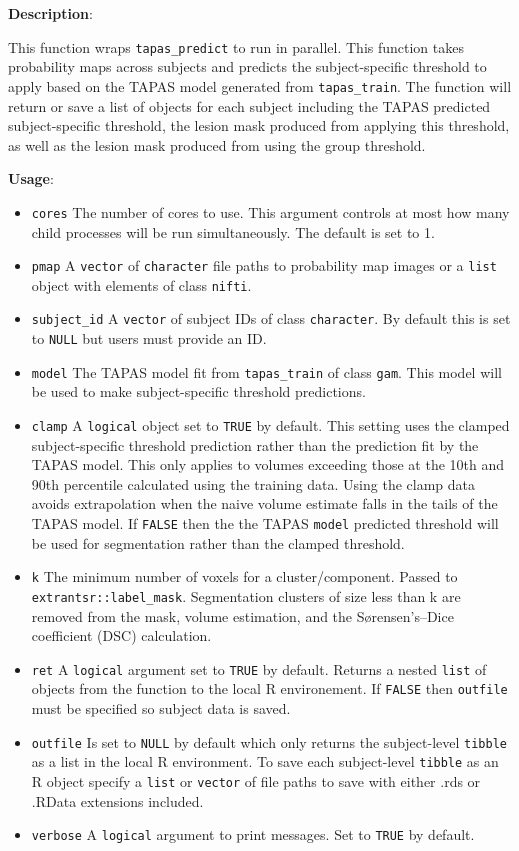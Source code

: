 \documentclass[]{article}
\providecommand{\tightlist}{%
  \setlength{\itemsep}{0pt}\setlength{\parskip}{0pt}}
\begin{document}
\textbf{Description}:

This function wraps \texttt{tapas\_predict} to run in parallel. This
function takes probability maps across subjects and predicts the
subject-specific threshold to apply based on the TAPAS model generated
from \texttt{tapas\_train}. The function will return or save a list of
objects for each subject including the TAPAS predicted subject-specific
threshold, the lesion mask produced from applying this threshold, as
well as the lesion mask produced from using the group threshold.

\textbf{Usage}:

\begin{itemize}
\tightlist
\item
  \texttt{cores} The number of cores to use. This argument controls at
  most how many child processes will be run simultaneously. The default
  is set to 1.
\item
  \texttt{pmap} A \texttt{vector} of \texttt{character} file paths to
  probability map images or a \texttt{list} object with elements of
  class \texttt{nifti}.
\item
  \texttt{subject\_id} A \texttt{vector} of subject IDs of class
  \texttt{character}. By default this is set to \texttt{NULL} but users
  must provide an ID.
\item
  \texttt{model} The TAPAS model fit from \texttt{tapas\_train} of class
  \texttt{gam}. This model will be used to make subject-specific
  threshold predictions.
\item
  \texttt{clamp} A \texttt{logical} object set to \texttt{TRUE} by
  default. This setting uses the clamped subject-specific threshold
  prediction rather than the prediction fit by the TAPAS model. This
  only applies to volumes exceeding those at the 10th and 90th
  percentile calculated using the training data. Using the clamp data
  avoids extrapolation when the naive volume estimate falls in the tails
  of the TAPAS model. If \texttt{FALSE} then the the TAPAS
  \texttt{model} predicted threshold will be used for segmentation
  rather than the clamped threshold.
\item
  \texttt{k} The minimum number of voxels for a cluster/component.
  Passed to \texttt{extrantsr::label\_mask}. Segmentation clusters of
  size less than k are removed from the mask, volume estimation, and the
  Sørensen's--Dice coefficient (DSC) calculation.
\item
  \texttt{ret} A \texttt{logical} argument set to \texttt{TRUE} by
  default. Returns a nested \texttt{list} of objects from the function
  to the local R environement. If \texttt{FALSE} then \texttt{outfile}
  must be specified so subject data is saved.
\item
  \texttt{outfile} Is set to \texttt{NULL} by default which only returns
  the subject-level \texttt{tibble} as a list in the local R
  environment. To save each subject-level \texttt{tibble} as an R object
  specify a \texttt{list} or \texttt{vector} of file paths to save with
  either .rds or .RData extensions included.
\item
  \texttt{verbose} A \texttt{logical} argument to print messages. Set to
  \texttt{TRUE} by default.
\end{itemize}
\end{document}
